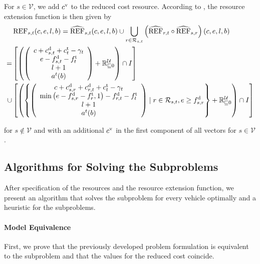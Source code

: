 For $s\in\mathcal{V}$, we add $c^{\operatorname{v}}$ to the reduced cost resource. According to , the resource extension function is then given by
\begin{align*}
	& \operatorname{REF}_{s,t}(c,e,l,b) = \widehat{\operatorname{REF}}_{s,t}(c,e,l,b)\cup\bigcup_{r\in\mathcal{R}_{s,t}}\left(\widehat{\operatorname{REF}}_{r,t}\circ\widehat{\operatorname{REF}}_{s,r}\right)(c,e,l,b) \\
	= & \left[\left(\left(\begin{array}{c}
		c + c^{\operatorname{d}}_{s,t} + c^{\operatorname{t}}_t - \gamma_t \\ e - f^{\operatorname{d}}_{s,t} - f^{\operatorname{t}}_t \\ l + 1 \\ a^t(b)
	\end{array} \right) + \mathbb{R}^{\mathcal{U}}_{\sqsubseteq 0}\right)\cap I\right] \\
	\cup & \left[\left(\left\{\left(\begin{array}{c}
		c + c^{\operatorname{d}}_{s,r} + c^{\operatorname{d}}_{r,t} + c^{\operatorname{t}}_t - \gamma_t \\ \min\left(e-f^{\operatorname{d}}_{s,r}-f^{\operatorname{t}}_r,1\right) - f^{\operatorname{d}}_{r,t} - f^{\operatorname{t}}_t \\ l + 1 \\ a^t(b)
	\end{array}\right) \mid r\in\mathcal{R}_{s,t}, e\geq f^{\operatorname{d}}_{s,r}\right\} + \mathbb{R}^{\mathcal{U}}_{\sqsubseteq 0}\right)\cap I\right]
\end{align*}

for $s\notin\mathcal{V}$ and with an additional $c^{\operatorname{v}}$ in the first component of all vectors for $s\in\mathcal{V}$.


\subsection{Algorithms for Solving the Subproblems}

After specification of the resources and the resource extension function, we present an algorithm that solves the subproblem for every vehicle optimally and a heuristic for the subproblems.

\paragraph{Model Equivalence} \parfill

First, we prove that the previously developed problem formulation is equivalent to the subproblem and that the values for the reduced cost coincide.

